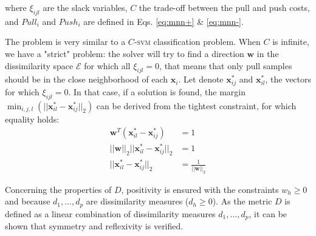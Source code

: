 \noindent where $\xi_{ijl}$ are the slack variables, $C$ the trade-off between the pull and push costs, and $Pull_i$ and $Push_i$ are defined in Eqs. \ref{eq:mnn+} \& \ref{eq:mnn-}. 

The problem is very similar to a $C$-\textsc{svm} classification problem. When $C$ is infinite, we have a "strict" problem: the solver will try to find a direction $\textbf{w}$ in the dissimilarity space $\mathcal{E}$ for which all $\xi_{ijl} = 0$, that means that only pull samples should be in the close neighborhood of each $\textbf{x}_i$. Let denote $\textbf{x}_{ij}^*$ and $\textbf{x}_{il}^*$, the vectors for which $\xi_{ijl} = 0$. In that case, if a solution is found, the margin $\displaystyle  \min_{i,j,l}(||\textbf{x}_{il}^* - \textbf{x}_{ij}^*||_2)$ can be derived from the tightest constraint, for which equality holds:
\begin{align*}
	\textbf{w}^T(\textbf{x}_{il}^* - \textbf{x}_{ij}^*) & = 1 \\
	||\textbf{w}||_2  ||\textbf{x}_{il}^* - \textbf{x}_{ij}^*||_2 & = 1 \\
	||\textbf{x}_{il}^* - \textbf{x}_{ij}^*||_2 & = \frac{1}{||\textbf{w}||_2}
\end{align*}

 


\noindent Concerning the properties of $D$, positivity is ensured with the constraints $w_h \geq 0$ and because $d_1, \ldots, d_p$ are dissimilarity measures ($d_h \geq 0$). As the metric $D$ is defined as a linear combination of dissimilarity measures $d_1, \ldots, d_p$, it can be shown that symmetry and reflexivity is verified.


